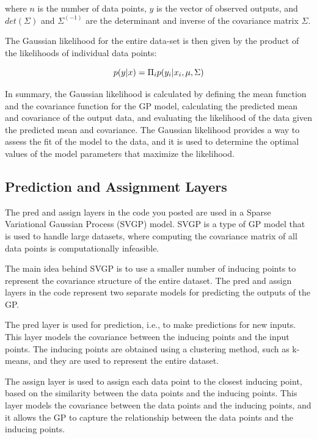 \documentclass[12pt,a4paper]{report}
\begin{document}
where $n$ is the number of data points, $y$ is the vector of observed outputs, and $det(\Sigma)$ and $\Sigma^(-1)$ are the determinant and inverse of the covariance matrix $\Sigma$.

The Gaussian likelihood for the entire data-set is then given by the product of the likelihoods of individual data points:

\begin{equation}
    \centering
    p(y|x) = \Pi_i p(y_i|x_i, \mu, \Sigma) 
\end{equation}

In summary, the Gaussian likelihood is calculated by defining the mean function and the covariance function for the GP model, calculating the predicted mean and covariance of the output data, and evaluating the likelihood of the data given the predicted mean and covariance. 
The Gaussian likelihood provides a way to assess the fit of the model to the data, and it is used to determine the optimal values of the model parameters that maximize the likelihood.

\subsection{Prediction and Assignment Layers}

The pred and assign layers in the code you posted are used in a Sparse Variational Gaussian Process (SVGP) model. 
SVGP is a type of GP model that is used to handle large datasets, where computing the covariance matrix of all data points is computationally infeasible.

The main idea behind SVGP is to use a smaller number of inducing points to represent the covariance structure of the entire dataset. 
The pred and assign layers in the code represent two separate models for predicting the outputs of the GP.

The pred layer is used for prediction, i.e., to make predictions for new inputs. 
This layer models the covariance between the inducing points and the input points. 
The inducing points are obtained using a clustering method, such as k-means, and they are used to represent the entire dataset.

The assign layer is used to assign each data point to the closest inducing point, based on the similarity between the data points and the inducing points. 
This layer models the covariance between the data points and the inducing points, and it allows the GP to capture the relationship between the data points and the inducing points.
\end{document}
